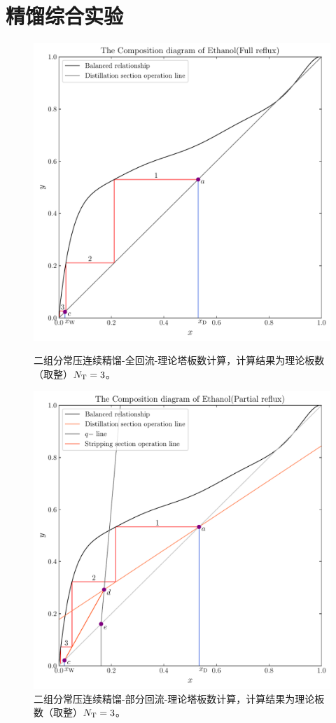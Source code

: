 \documentclass[UTF8,AutoFakeBold,a4paper]{article}
\begin{document}
\newpage
\section{精馏综合实验}
\newpage
\begin{figure}[h]
	\centering
	\includegraphics[scale=0.6]{全回流}
	\caption{二组分常压连续精馏-全回流-理论塔板数计算，计算结果为理论板数（取整）$N_{\rm{T}} = 3$。}
	\label{fi3}
\vspace*{20pt}
	\centering
	\includegraphics[scale=0.6]{部分回流}
	\caption{二组分常压连续精馏-部分回流-理论塔板数计算，计算结果为理论板数（取整）$N_{\rm{T}} = 3$。}
	\label{fi3}
\end{figure}
\end{document}
